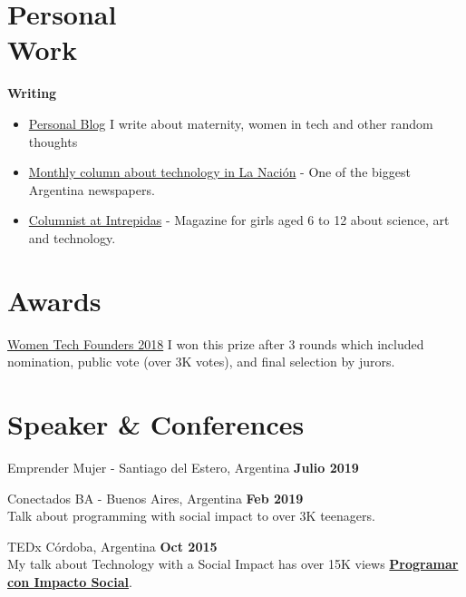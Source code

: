 \documentclass[margin,line]{resume}
\begin{document}
\begin{resume}
\section{\mysidestyle Personal\\Work}


\textbf{Writing}
\begin{itemize}
\item \href{https://medium.com/@carohadad} {Personal Blog}  I write about maternity, women in tech and other random thoughts
\item \href{http://www.lanacion.com.ar/autor/carolina-hadad-10522} {Monthly column about technology in La Naci\'on} - One of the biggest Argentina newspapers.
\item \href{https://www.intrepidas.com.ar/} {Columnist at Intrepidas} - Magazine for girls aged 6 to 12 about science, art and technology.
\end{itemize}




\section{\mysidestyle Awards}

\begin{list2}
\item \href{https://womentechfounders.com/2018-award-winners/}{Women Tech Founders 2018} I won this prize after 3 rounds which included nomination, public vote (over 3K votes), and final selection by jurors.
\end{list2}


\section{\mysidestyle Speaker \& Conferences}

\begin{list2}
\item Emprender Mujer - Santiago del Estero, Argentina \hfill \textbf{Julio 2019}  
\item Conectados BA - Buenos Aires, Argentina \hfill \textbf{Feb 2019}  \\
Talk about programming with social impact to over 3K teenagers.

\item  TEDx C\'ordoba, Argentina \hfill \textbf{Oct 2015}  \\
My talk about Technology with a Social Impact has over 15K views \href{https://www.youtube.com/watch?v=0cx8UwdN-g4&t=1s}{\textbf{Programar con Impacto Social}}.



\end{list2}
\end{resume}
\end{document}
